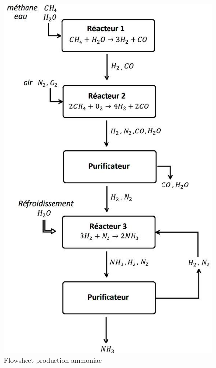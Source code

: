 \documentclass[11pt,a4paper]{report}
\begin{document}
\begin{figure}[ht!]
 \centering
 \includegraphics[scale=0.6]{flowsheet.jpg}
 \caption{Flowsheet production ammoniac}
 \label{scheme}
 
\end{figure}
\end{document}
